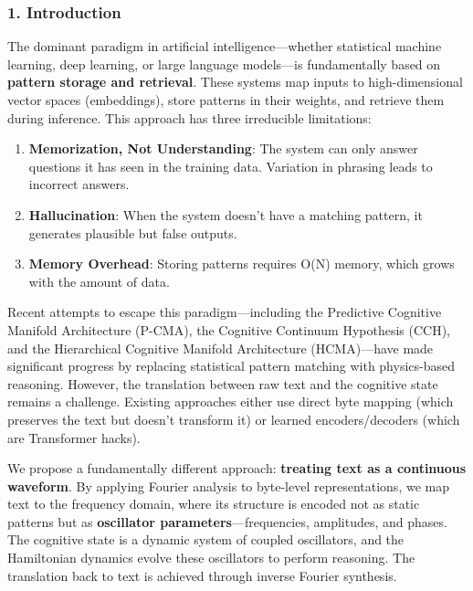 \documentclass[
  11pt,
  a4paper,
]{article}
\providecommand{\tightlist}{%
  \setlength{\itemsep}{0pt}\setlength{\parskip}{0pt}}
\begin{document}
\subsubsection{1. Introduction}\label{introduction-6}

The dominant paradigm in artificial intelligence---whether statistical
machine learning, deep learning, or large language models---is
fundamentally based on \textbf{pattern storage and retrieval}. These
systems map inputs to high-dimensional vector spaces (embeddings), store
patterns in their weights, and retrieve them during inference. This
approach has three irreducible limitations:

\begin{enumerate}
\def\labelenumi{\arabic{enumi}.}
\tightlist
\item
  \textbf{Memorization, Not Understanding}: The system can only answer
  questions it has seen in the training data. Variation in phrasing
  leads to incorrect answers.
\item
  \textbf{Hallucination}: When the system doesn't have a matching
  pattern, it generates plausible but false outputs.
\item
  \textbf{Memory Overhead}: Storing patterns requires O(N) memory, which
  grows with the amount of data.
\end{enumerate}

Recent attempts to escape this paradigm---including the Predictive
Cognitive Manifold Architecture (P-CMA), the Cognitive Continuum
Hypothesis (CCH), and the Hierarchical Cognitive Manifold Architecture
(HCMA)---have made significant progress by replacing statistical pattern
matching with physics-based reasoning. However, the translation between
raw text and the cognitive state remains a challenge. Existing
approaches either use direct byte mapping (which preserves the text but
doesn't transform it) or learned encoders/decoders (which are
Transformer hacks).

We propose a fundamentally different approach: \textbf{treating text as
a continuous waveform}. By applying Fourier analysis to byte-level
representations, we map text to the frequency domain, where its
structure is encoded not as static patterns but as \textbf{oscillator
parameters}---frequencies, amplitudes, and phases. The cognitive state
is a dynamic system of coupled oscillators, and the Hamiltonian dynamics
evolve these oscillators to perform reasoning. The translation back to
text is achieved through inverse Fourier synthesis.
\end{document}
